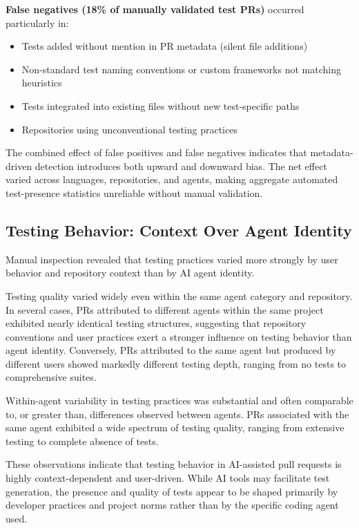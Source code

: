 \documentclass[conference]{IEEEtran}
\begin{document}
\textbf{False negatives (18\% of manually validated test PRs)} occurred particularly in:
\begin{itemize}
    \item Tests added without mention in PR metadata (silent file additions)
    \item Non-standard test naming conventions or custom frameworks not matching heuristics
    \item Tests integrated into existing files without new test-specific paths
    \item Repositories using unconventional testing practices
\end{itemize}

The combined effect of false positives and false negatives indicates that metadata-driven detection introduces both upward and downward bias. The net effect varied across languages, repositories, and agents, making aggregate automated test-presence statistics unreliable without manual validation.

\subsection{Testing Behavior: Context Over Agent Identity}

Manual inspection revealed that testing practices varied more strongly by user behavior and repository context than by AI agent identity.

Testing quality varied widely even within the same agent category and repository. In several cases, PRs attributed to different agents within the same project exhibited nearly identical testing structures, suggesting that repository conventions and user practices exert a stronger influence on testing behavior than agent identity. Conversely, PRs attributed to the same agent but produced by different users showed markedly different testing depth, ranging from no tests to comprehensive suites.

Within-agent variability in testing practices was substantial and often comparable to, or greater than, differences observed between agents. PRs associated with the same agent exhibited a wide spectrum of testing quality, ranging from extensive testing to complete absence of tests.

These observations indicate that testing behavior in AI-assisted pull requests is highly context-dependent and user-driven. While AI tools may facilitate test generation, the presence and quality of tests appear to be shaped primarily by developer practices and project norms rather than by the specific coding agent used.
\end{document}
